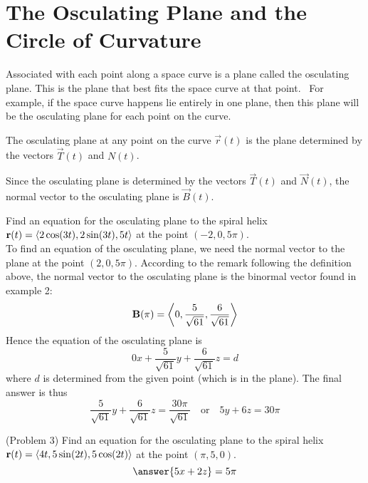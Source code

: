 \documentclass[handout]{ximera}
\begin{document}
\section{The Osculating Plane and the Circle of Curvature}

Associated with each point along a space curve is a plane called the osculating plane.  This is the plane that best fits the space curve at that point.  \
For example, if the space curve happens lie entirely in one plane, then this plane will be the osculating plane for each point on the curve.

\begin{definition}
The osculating plane at any point on the curve $\vec r(t)$ is the plane determined by the vectors $\vec T(t)$ and $N(t)$.
\end{definition}

\begin{remark}
Since the osculating plane is determined by the vectors $\vec T(t)$ and $\vec N(t)$, the normal vector to the osculating plane is $\vec B(t)$.
\end{remark}

\begin{example}[Example 3]
Find an equation for the osculating plane to the spiral helix $\mathbf r(t) =  \left\langle 2\cos(3t), 2\sin(3t), 5t\right\rangle$ at the point $(-2, 0, 5\pi)$.\\
To find an equation of the osculating plane, we need the normal vector to the plane at the point $(2, 0, 5\pi)$.
According to the remark following the definition above, the normal vector to the osculating plane is the binormal vector found in example 2:
\[
\mathbf B(\pi) =   \left\langle 0, \frac{5}{\sqrt {61}}, \frac{6}{\sqrt{61}}\right\rangle
\]
Hence the equation of the osculating plane is
\[
0x + \frac{5}{\sqrt {61}}y +\frac{6}{\sqrt{61}}z = d
\]
where $d$ is determined from the given point (which is in the plane).
The final answer is thus
\[
\frac{5}{\sqrt {61}}y +\frac{6}{\sqrt{61}}z = \frac{30\pi}{\sqrt{61}} \quad \text{or} \quad 5y+6z = 30\pi
\]
\end{example}

\begin{problem}(Problem 3)
Find an equation for the osculating plane to the spiral helix $\mathbf r(t) = \left\langle 4t, 5 \sin(2t),5\cos(2t)\right\rangle$ at the point $(\pi, 5, 0)$.\\
\[
\answer{5x + 2z } = 5\pi
\]
\end{problem}
\end{document}
